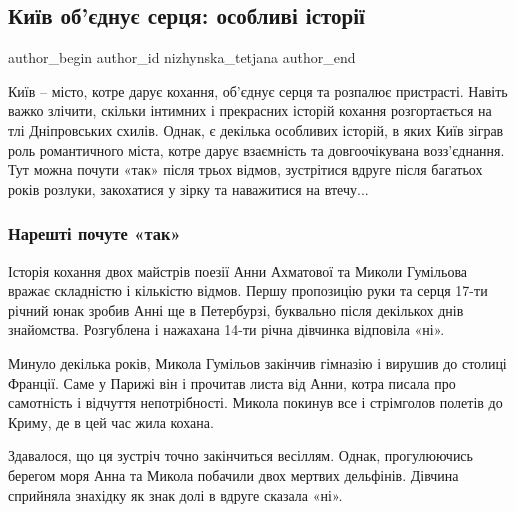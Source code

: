  
 
 
 
 
 
\subsection{Київ об’єднує серця: особливі історії}
\label{sec:14_02_2022.stz.kiev.bigkyiv.1.kiev_serca}
 
\ifcmt
 author_begin
   author_id nizhynska_tetjana
 author_end
\fi

Київ – місто, котре дарує кохання, об’єднує серця та розпалює пристрасті.
Навіть важко злічити, скільки інтимних і прекрасних історій кохання
розгортається на тлі Дніпровських схилів. Однак, є декілька особливих історій,
в яких Київ зіграв роль романтичного міста, котре дарує взаємність та
довгоочікувана возз’єднання. Тут можна почути «так» після трьох відмов,
зустрітися вдруге після багатьох років розлуки, закохатися у зірку та
наважитися на втечу... 

\subsubsection{Нарешті почуте «так»}

Історія кохання двох майстрів поезії Анни Ахматової та Миколи Гумільова вражає
складністю і кількістю відмов. Першу пропозицію руки та серця 17-ти річний юнак
зробив Анні ще в Петербурзі, буквально після декількох днів знайомства.
Розгублена і нажахана 14-ти річна дівчинка відповіла «ні».

Минуло декілька років, Микола Гумільов закінчив гімназію і вирушив до столиці
Франції. Саме у Парижі він і прочитав листа від Анни, котра писала про
самотність і відчуття непотрібності. Микола покинув все і стрімголов полетів до
Криму, де в цей час жила кохана.

Здавалося, що ця зустріч точно закінчиться весіллям. Однак, прогулюючись
берегом моря Анна та Микола побачили двох мертвих дельфінів. Дівчина сприйняла
знахідку як знак долі в вдруге сказала «ні».
